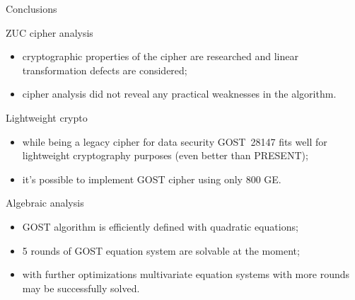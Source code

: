 \documentclass[10pt, ucs]{beamer}
\begin{document}
\begin{frame}{Conclusions}
    \small
    \begin{block}{ZUC cipher analysis}
        \begin{itemize}
            \item cryptographic properties of the cipher are researched and
                linear transformation defects are considered;
            \item cipher analysis did not reveal any practical
                weaknesses in the algorithm.
        \end{itemize}
    \end{block}

    \begin{block}{Lightweight crypto}
        \begin{itemize}
            \item while being a legacy cipher for data security GOST~28147 fits
                well for lightweight cryptography purposes (even better than PRESENT);
            \item it's possible to implement GOST cipher using only 800 GE.
        \end{itemize}
    \end{block}

    \begin{block}{Algebraic analysis}
        \begin{itemize}
            \item GOST algorithm is efficiently defined with quadratic equations;
            \item 5 rounds of GOST equation system are solvable at the moment;
            \item with further optimizations multivariate equation systems with
                more rounds may be successfully solved.
        \end{itemize}
    \end{block}
\end{frame}
\end{document}
